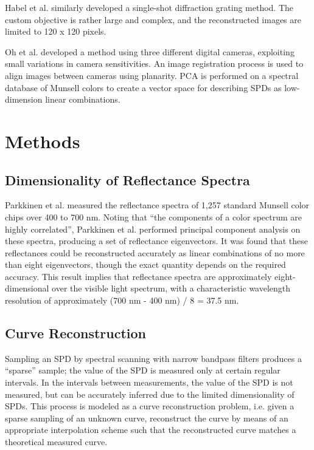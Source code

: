\documentclass[twocolumn,10pt]{asme2ej}
\begin{document}
Habel et al. \cite{Habel} similarly developed a single-shot diffraction grating method. The custom objective is rather large and complex, and the reconstructed images are limited to 120 x 120 pixels.

Oh et al. \cite{Oh} developed a method using three different digital cameras, exploiting small variations in camera sensitivities. An image registration process is used to align images between cameras using planarity. PCA is performed on a spectral database of Munsell colors to create a vector space for describing SPDs as low-dimension linear combinations.

\section{Methods}

\subsection{Dimensionality of Reflectance Spectra}

\noindent Parkkinen et al. measured the reflectance spectra of 1,257 standard Munsell color chips over 400 to 700 nm. Noting that ``the components of a color spectrum are highly correlated'', Parkkinen et al. performed principal component analysis on these spectra, producing a set of reflectance eigenvectors. It was found that these reflectances could be reconstructed accurately as linear combinations of no more than eight eigenvectors, though the exact quantity depends on the required accuracy. This result implies that reflectance spectra are approximately eight-dimensional over the visible light spectrum, with a characteristic wavelength resolution of approximately (700 nm - 400 nm) / 8 = 37.5 nm.

\subsection{Curve Reconstruction}
\label{curve_reconstruction}

\noindent Sampling an SPD by spectral scanning with narrow bandpass filters produces a ``sparse'' sample; the value of the SPD is measured only at certain regular intervals. In the intervals between measurements, the value of the SPD is not measured, but can be accurately inferred due to the limited dimensionality of SPDs. This process is modeled as a curve reconstruction problem, i.e. given a sparse sampling of an unknown curve, reconstruct the curve by means of an appropriate interpolation scheme such that the reconstructed curve matches a theoretical measured curve.
\end{document}

